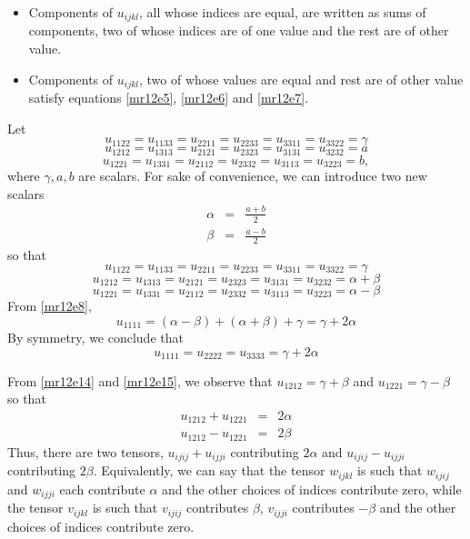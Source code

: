 \begin{itemize}
\begin{itemize}
\item Components of $u_{ijkl}$, all whose indices are equal, are written as sums of components, two of whose indices are of one value and the rest are of other value.
\item Components of $u_{ijkl}$, two of whose values are equal and rest are of other value satisfy equations \eqref{mr12e5}, \eqref{mr12e6} and \eqref{mr12e7}.
\end{itemize}
Let
\[
u_{1122} = u_{1133} = u_{2211} = u_{2233} = u_{3311} = u_{3322} = \gamma 
\]
\[
u_{1212} = u_{1313} = u_{2121} = u_{2323} = u_{3131} = u_{3232} = a
\]
\[
u_{1221} = u_{1331} = u_{2112} = u_{2332} = u_{3113} = u_{3223} = b, 
\]
where $\gamma, a, b$ are scalars. For sake of convenience, we can introduce two new scalars
\begin{eqnarray*}
\alpha &=& \frac{a + b}{2} \\
\beta &=& \frac{a - b}{2}
\end{eqnarray*}
so that
\begin{equation}\label{mr12e13}
u_{1122} = u_{1133} = u_{2211} = u_{2233} = u_{3311} = u_{3322} =  \gamma
\end{equation}
\begin{equation}\label{mr12e14}
u_{1212} = u_{1313} = u_{2121} = u_{2323} = u_{3131} = u_{3232} = \alpha + \beta
\end{equation}
\begin{equation}\label{mr12e15}
u_{1221} = u_{1331} = u_{2112} = u_{2332} = u_{3113} = u_{3223} = \alpha - \beta 
\end{equation}
From \eqref{mr12e8},
\[
u_{1111} = (\alpha - \beta) + (\alpha + \beta) + \gamma = \gamma + 2\alpha
\]
By symmetry, we conclude that
\begin{equation}\label{mr12e16}
u_{1111} = u_{2222} = u_{3333} = \gamma + 2\alpha
\end{equation}

From \eqref{mr12e14} and \eqref{mr12e15}, we observe that $u_{1212} = \gamma + \beta$ and $u_{1221} = \gamma - \beta$ so that
\begin{eqnarray*}
u_{1212} + u_{1221} &=& 2\alpha \\
u_{1212} - u_{1221} &=& 2\beta
\end{eqnarray*}
Thus, there are two tensors, $u_{ijij} + u_{ijji}$ contributing $2\alpha$ and $u_{ijij} - u_{ijji}$ contributing $2\beta$. Equivalently, we can say that the tensor $w_{ijkl}$ is such that
$w_{ijij}$ and $w_{ijji}$ each contribute $\alpha$ and the other choices of indices contribute zero, while the tensor $v_{ijkl}$ is such that $v_{ijij}$ contributes $\beta$, $v_{ijji}$ 
contributes $-\beta$  and the other choices of indices contribute zero.


\end{itemize}
